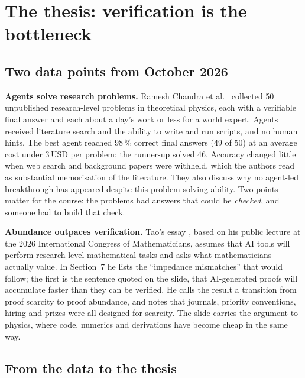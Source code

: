 \section{The thesis: verification is the bottleneck}\label{sec:thesis}


\subsection{Two data points from October 2026}

\textbf{Agents solve research problems.} Ramesh Chandra et al.\ 
collected 50 unpublished research-level problems in theoretical physics, each with a
verifiable final answer and each about a day's work or less for a world expert. Agents
received literature search and the ability to write and run scripts, and no human hints.
The best agent reached $98\,\%$ correct final answers (49 of 50) at an average cost under
3\,USD per problem; the runner-up solved 46. Accuracy changed little when web search
and background papers were withheld, which the authors read as substantial memorisation
of the literature. They also discuss why no agent-led breakthrough has appeared despite
this problem-solving ability. Two points matter for the course: the problems had answers
that could be \emph{checked}, and someone had to build that check.

\textbf{Abundance outpaces verification.} Tao's essay , based on his public
lecture at the 2026 International Congress of Mathematicians, assumes that AI tools will
perform research-level mathematical tasks and asks what mathematicians actually value.
In Section~7 he lists the ``impedance mismatches'' that would follow; the first is the
sentence quoted on the slide, that AI-generated proofs will accumulate faster than they
can be verified. He calls the result a transition from proof scarcity to proof
abundance, and notes that journals, priority conventions, hiring and prizes were all
designed for scarcity. The slide carries the argument to physics, where code, numerics
and derivations have become cheap in the same way.

\subsection{From the data to the thesis}

